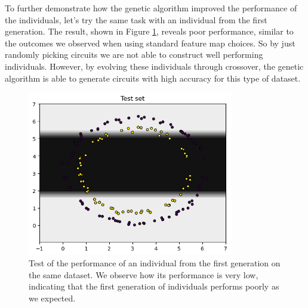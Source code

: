 \documentclass[12pt]{article}
\begin{document}
To further demonstrate how the genetic algorithm improved the performance of the individuals, let's try the same task with an individual from the first generation. The result, shown in Figure \ref{fig:bad}, reveals poor performance, similar to the outcomes we observed when using standard feature map choices. So by just randomly picking circuits we are not able to construct well performing individuals. However, by evolving these individuals through crossover, the genetic algorithm is able to generate circuits with high accuracy for this type of dataset.
\begin{figure}[h!]
    \centering
    \includegraphics[width=0.8\textwidth]{images/badresult.png}
    \caption{Test of the performance of an individual from the first generation on the same dataset. We observe how its performance is very low, indicating that the first generation of individuals performs poorly as we expected.}
    \label{fig:bad}
\end{figure}
\end{document}

